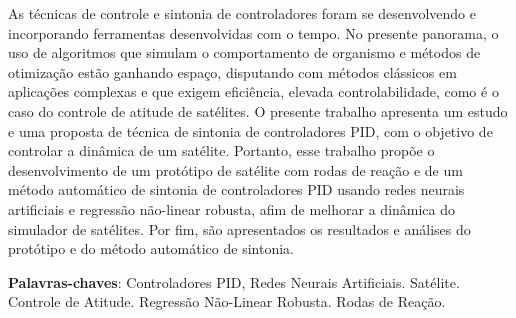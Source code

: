 \setlength{\absparsep}{18pt} %
\begin{resumo}
    As técnicas de controle e sintonia de controladores foram se desenvolvendo e incorporando ferramentas desenvolvidas com o tempo. No presente panorama, o  uso de algoritmos que simulam o comportamento de organismo e métodos de otimização estão ganhando espaço, disputando com métodos clássicos em aplicações complexas e que exigem eficiência, elevada controlabilidade, como é o caso do controle de atitude de satélites. O presente trabalho apresenta um estudo e uma proposta de técnica de sintonia de controladores PID, com o objetivo de controlar a dinâmica de um satélite. Portanto, esse trabalho propõe o desenvolvimento de um protótipo de satélite com rodas de reação e de um método automático de sintonia de controladores PID usando redes neurais artificiais e regressão não-linear robusta, afim de melhorar a dinâmica do simulador de satélites. Por fim, são apresentados os resultados e análises do protótipo e do método automático de sintonia.
	\vspace{\onelineskip}
	\noindent 
	
	\textbf{Palavras-chaves}: Controladores PID, Redes Neurais Artificiais. Satélite. Controle de Atitude. Regressão Não-Linear Robusta. Rodas de Reação. 
\end{resumo}

 
